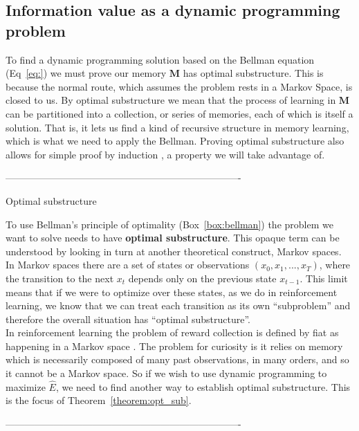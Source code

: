 	

\subsection*{Information value as a dynamic programming problem} To find a dynamic programming solution based on the Bellman equation (Eq~\ref{eq:}) we must prove our memory $\mathbf{M}$ has optimal substructure. This is because the normal route, which assumes the problem rests in a Markov Space, is closed to us. By optimal substructure we mean that the process of learning in $\mathbf{M}$ can be partitioned into a collection, or series of memories, each of which is itself a solution. That is, it lets us find a kind of recursive structure in memory learning, which is what we need to apply the Bellman. Proving optimal substructure also allows for simple proof by induction \citep{Roughgarden2019}, a property we will take advantage of. 

-------------------------------------------------------------------------
\begin{featurebox}
	\caption{Optimal substructure}
	\label{box:substructure}
	To use Bellman's principle of optimality (Box~\ref{box:bellman}) the problem we want to solve needs to have \textbf{optimal substructure}. This opaque term can be understood by looking in turn at another theoretical construct, Markov spaces. 
	\\
	In Markov spaces there are a set of states or observations $(x_0, x_1, ..., x_{T})$, where the transition to the next $x_t$ depends only on the previous state $x_{t-1}$. This limit means that if we were to optimize over these states, as we do in reinforcement learning, we know that we can treat each transition as its own ``subproblem'' and therefore the overall situation has ``optimal substructure''.
	\\
	In reinforcement learning the problem of reward collection is defined by fiat as happening in a Markov space \citep{Sutton2018}. The problem for curiosity is it relies on memory which is necessarily composed of many past observations, in many orders, and so it cannot be a Markov space. So if we wish to use dynamic programming to maximize $\hat E$, we need to find another way to establish optimal substructure. This is the focus of Theorem~\ref{theorem:opt_sub}.
	\medskip
\end{featurebox}
-------------------------------------------------------------------------

